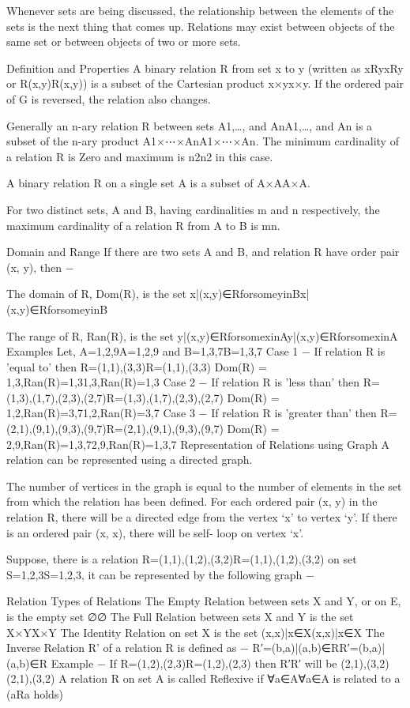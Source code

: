 Whenever sets are being discussed, the relationship between the elements of the sets is the next thing that comes up. Relations may exist between objects of the same set or between objects of two or more sets.

Definition and Properties
A binary relation R from set x to y (written as xRyxRy or R(x,y)R(x,y)) is a subset of the Cartesian product x×yx×y. If the ordered pair of G is reversed, the relation also changes.

Generally an n-ary relation R between sets A1,…, and AnA1,…, and An is a subset of the n-ary product A1×⋯×AnA1×⋯×An. The minimum cardinality of a relation R is Zero and maximum is n2n2 in this case.

A binary relation R on a single set A is a subset of A×AA×A.

For two distinct sets, A and B, having cardinalities m and n respectively, the maximum cardinality of a relation R from A to B is mn.

Domain and Range
If there are two sets A and B, and relation R have order pair (x, y), then −

The domain of R, Dom(R), is the set {x|(x,y)∈RforsomeyinB}{x|(x,y)∈RforsomeyinB}

The range of R, Ran(R), is the set {y|(x,y)∈RforsomexinA}{y|(x,y)∈RforsomexinA}
Examples
Let, A={1,2,9}A={1,2,9} and B={1,3,7}B={1,3,7}
Case 1 − If relation R is 'equal to' then R={(1,1),(3,3)}R={(1,1),(3,3)}
Dom(R) = {1,3},Ran(R)={1,3}{1,3},Ran(R)={1,3}
Case 2 − If relation R is 'less than' then R={(1,3),(1,7),(2,3),(2,7)}R={(1,3),(1,7),(2,3),(2,7)}
Dom(R) = {1,2},Ran(R)={3,7}{1,2},Ran(R)={3,7}
Case 3 − If relation R is 'greater than' then R={(2,1),(9,1),(9,3),(9,7)}R={(2,1),(9,1),(9,3),(9,7)}
Dom(R) = {2,9},Ran(R)={1,3,7}{2,9},Ran(R)={1,3,7}
Representation of Relations using Graph
A relation can be represented using a directed graph.

The number of vertices in the graph is equal to the number of elements in the set from which the relation has been defined. For each ordered pair (x, y) in the relation R, there will be a directed edge from the vertex ‘x’ to vertex ‘y’. If there is an ordered pair (x, x), there will be self- loop on vertex ‘x’.

Suppose, there is a relation R={(1,1),(1,2),(3,2)}R={(1,1),(1,2),(3,2)} on set S={1,2,3}S={1,2,3}, it can be represented by the following graph −

Relation
Types of Relations
The Empty Relation between sets X and Y, or on E, is the empty set ∅∅
The Full Relation between sets X and Y is the set X×YX×Y
The Identity Relation on set X is the set {(x,x)|x∈X}{(x,x)|x∈X}
The Inverse Relation R' of a relation R is defined as − R′={(b,a)|(a,b)∈R}R′={(b,a)|(a,b)∈R}
Example − If R={(1,2),(2,3)}R={(1,2),(2,3)} then R′R′ will be {(2,1),(3,2)}{(2,1),(3,2)}
A relation R on set A is called Reflexive if ∀a∈A∀a∈A is related to a (aRa holds)

